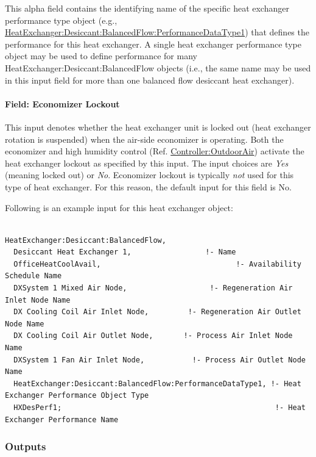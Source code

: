 This alpha field contains the identifying name of the specific heat exchanger performance type object (e.g., \hyperref[heatexchangerdesiccantbalancedflowperformancedatatype1]{HeatExchanger:Desiccant:BalancedFlow:PerformanceDataType1}) that defines the performance for this heat exchanger. A single heat exchanger performance type object may be used to define performance for many HeatExchanger:Desiccant:BalancedFlow objects (i.e., the same name may be used in this input field for more than one balanced flow desiccant heat exchanger).

\paragraph{Field: Economizer Lockout}\label{field-economizer-lockout-2}

This input denotes whether the heat exchanger unit is locked out (heat exchanger rotation is suspended) when the air-side economizer is operating. Both the economizer and high humidity control (Ref. \hyperref[controlleroutdoorair]{Controller:OutdoorAir}) activate the heat exchanger lockout as specified by this input. The input choices are \emph{Yes} (meaning locked out) or \emph{No}. Economizer lockout is typically \emph{not} used for this type of heat exchanger. For this reason, the default input for this field is No.

Following is an example input for this heat exchanger object:

\begin{lstlisting}

HeatExchanger:Desiccant:BalancedFlow,
  Desiccant Heat Exchanger 1,                 !- Name
  OfficeHeatCoolAvail,                               !- Availability Schedule Name
  DXSystem 1 Mixed Air Node,                   !- Regeneration Air Inlet Node Name
  DX Cooling Coil Air Inlet Node,         !- Regeneration Air Outlet Node Name
  DX Cooling Coil Air Outlet Node,       !- Process Air Inlet Node Name
  DXSystem 1 Fan Air Inlet Node,           !- Process Air Outlet Node Name
  HeatExchanger:Desiccant:BalancedFlow:PerformanceDataType1, !- Heat Exchanger Performance Object Type
  HXDesPerf1;                                                 !- Heat Exchanger Performance Name
\end{lstlisting}

\subsubsection{Outputs}\label{outputs-2-010}

